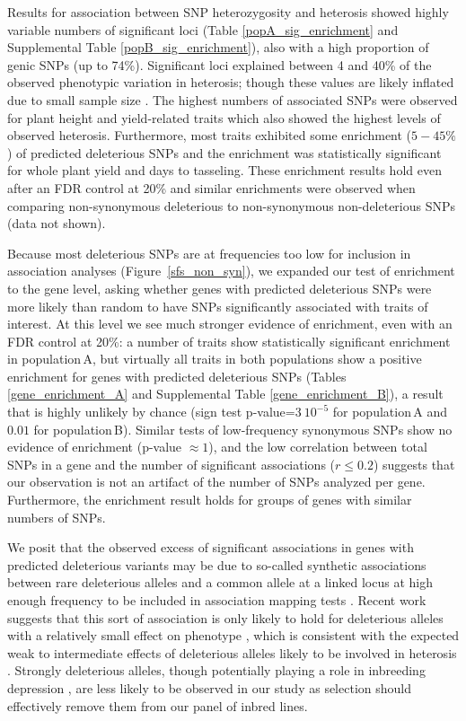 \documentclass[12pt]{article}
\begin{document}
Results for association between SNP heterozygosity and heterosis showed highly variable numbers of significant loci (Table \ref{popA_sig_enrichment} and Supplemental Table \ref{popB_sig_enrichment}), also with a high proportion of genic SNPs (up to 74\%). Significant loci explained between 4 and 40\% of the observed phenotypic variation in heterosis; though these values are likely inflated due to small sample size \citep{Beavis1994}. The highest numbers of associated SNPs were observed for plant height and yield-related traits which also showed the highest levels of observed heterosis. 
Furthermore, most traits exhibited some enrichment ($5-45\%$) of predicted deleterious SNPs and the enrichment was statistically significant for whole plant yield and days to tasseling. These enrichment results hold even after an FDR control at 20\% and similar enrichments were observed when comparing non-synonymous deleterious to non-synonymous non-deleterious SNPs (data not shown).

Because most deleterious SNPs are at frequencies too low for inclusion in association analyses (Figure~\ref{sfs_non_syn}), we expanded our test of enrichment to the gene level, asking whether genes with predicted deleterious SNPs were more likely than random to have SNPs significantly associated with traits of interest. At this level we see much stronger evidence of enrichment, even with an FDR control at 20\%: a number of traits show statistically significant enrichment in population\,A, but virtually all traits in both populations show a positive enrichment for genes with predicted deleterious SNPs (Tables \ref{gene_enrichment_A} and Supplemental Table \ref{gene_enrichment_B}), a result that is highly unlikely by chance (sign test p-value=$3\ 10^{-5}$ for population\,A and $0.01$ for population\,B). Similar tests of low-frequency synonymous SNPs show no evidence of enrichment (p-value $\approx 1$), and the low correlation between total SNPs in a gene and the number of significant associations ($r\leq 0.2$) suggests that our observation is not an artifact of the number of SNPs analyzed per gene. Furthermore, the enrichment result holds for groups of genes with similar numbers of SNPs.

We posit that the observed excess of significant associations in genes with predicted deleterious variants may be due to so-called synthetic associations between rare deleterious alleles and a common allele at a linked locus at high enough frequency to be included in association mapping tests \citep{Dickson2010,Goldstein2009}. Recent work suggests that this sort of association is only likely to hold for deleterious alleles with a relatively small effect on phenotype \citep{Thornton2013}, which is consistent with the expected weak to intermediate effects of deleterious alleles likely to be involved in heterosis \citep{Charlesworth1987,Whitlock2000,Glemin2003,Charlesworth2009}. Strongly deleterious alleles, though potentially playing a role in inbreeding depression \citep{Whitlock2000}, are less likely to be observed in our study as selection should effectively remove them from our panel of inbred lines.  
\end{document}
